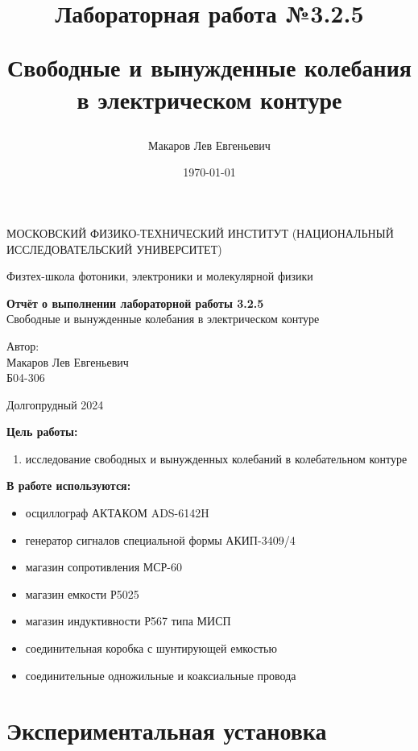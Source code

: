 \documentclass[a4paper,12pt]{article}
\author{Макаров Лев Евгеньевич}
\title{Лабораторная работа №3.2.5

Свободные и вынужденные колебания в электрическом контуре
}
\date{\today}
\begin{document}
\begin{titlepage}
	\begin{center}
		{\large МОСКОВСКИЙ ФИЗИКО-ТЕХНИЧЕСКИЙ ИНСТИТУТ (НАЦИОНАЛЬНЫЙ ИССЛЕДОВАТЕЛЬСКИЙ УНИВЕРСИТЕТ)}
	\end{center}
	\begin{center}
		{\large Физтех-школа фотоники, электроники и молекулярной физики}
	\end{center}
	
	
	\vspace{4.5cm}
	{\huge
		\begin{center}
			{\bf Отчёт о выполнении лабораторной работы 3.2.5}\\
			Свободные и вынужденные колебания в электрическом контуре
		\end{center}
	}
	\vspace{2cm}
	\begin{flushright}
		{\LARGE Автор:\\ Макаров Лев Евгеньевич \\
			\vspace{0.2cm}
			Б04-306}
	\end{flushright}
	\vspace{8cm}
	\begin{center}
		Долгопрудный 2024
	\end{center}
\end{titlepage}


\textbf{Цель работы:} 
\begin{enumerate}
	\item исследование свободных и вынужденных колебаний в колебательном контуре
\end{enumerate}

\textbf{В работе используются:} 
\begin{itemize}
    \item осциллограф АКТАКОМ ADS-6142H
    \item генератор сигналов специальной формы АКИП-3409/4
    \item магазин сопротивления МСР-60
    \item магазин емкости Р5025
    \item магазин индуктивности Р567 типа МИСП
    \item соединительная коробка с шунтирующей емкостью
    \item соединительные одножильные и коаксиальные провода
\end{itemize}
\medskip

\section{Экспериментальная установка}
\end{document}

